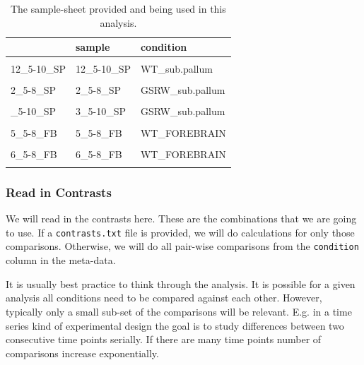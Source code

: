 \documentclass[
  letterpaper,
  DIV=11,
  numbers=noendperiod]{scrartcl}
\begin{document}
\hypertarget{tbl-read_meta_data}{}
\begin{table}
\caption{\label{tbl-read_meta_data}The sample-sheet provided and being used in this analysis. }\tabularnewline

\centering
\begin{tabular}[t]{lll}
\toprule
  & sample & condition\\
\midrule
\cellcolor{gray!6}{12\_5-10\_FB} & \cellcolor{gray!6}{12\_5-10\_FB} & \cellcolor{gray!6}{WT\_FOREBRAIN}\\
12\_5-10\_SP & 12\_5-10\_SP & WT\_sub.pallum\\
\cellcolor{gray!6}{2\_5-8\_FB} & \cellcolor{gray!6}{2\_5-8\_FB} & \cellcolor{gray!6}{GSRW\_FOREBRAIN}\\
2\_5-8\_SP & 2\_5-8\_SP & GSRW\_sub.pallum\\
\cellcolor{gray!6}{3\_5-10\_FB} & \cellcolor{gray!6}{3\_5-10\_FB} & \cellcolor{gray!6}{GSRW\_FOREBRAIN}\\
\addlinespace
3\_5-10\_SP & 3\_5-10\_SP & GSRW\_sub.pallum\\
\cellcolor{gray!6}{3\_5-8\_SP} & \cellcolor{gray!6}{3\_5-8\_SP} & \cellcolor{gray!6}{GSRW\_sub.pallum}\\
5\_5-8\_FB & 5\_5-8\_FB & WT\_FOREBRAIN\\
\cellcolor{gray!6}{5\_5-8\_SP} & \cellcolor{gray!6}{5\_5-8\_SP} & \cellcolor{gray!6}{WT\_sub.pallum}\\
6\_5-8\_FB & 6\_5-8\_FB & WT\_FOREBRAIN\\
\addlinespace
\cellcolor{gray!6}{6\_5-8\_SP} & \cellcolor{gray!6}{6\_5-8\_SP} & \cellcolor{gray!6}{WT\_sub.pallum}\\
\bottomrule
\end{tabular}
\end{table}

\hypertarget{read-in-contrasts}{%
\subsubsection{Read in Contrasts}\label{read-in-contrasts}}

We will read in the contrasts here. These are the combinations that we
are going to use. If a \texttt{contrasts.txt} file is provided, we will
do calculations for only those comparisons. Otherwise, we will do all
pair-wise comparisons from the \texttt{condition} column in the
meta-data.

It is usually best practice to think through the analysis. It is
possible for a given analysis all conditions need to be compared against
each other. However, typically only a small sub-set of the comparisons
will be relevant. E.g. in a time series kind of experimental design the
goal is to study differences between two consecutive time points
serially. If there are many time points number of comparisons increase
exponentially.
\end{document}
